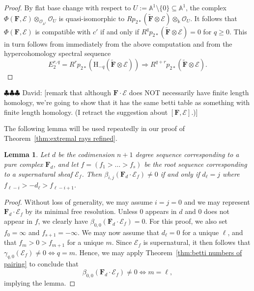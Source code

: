 \documentclass[12pt]{amsart}
\newtheorem{lemma}{Lemma}[section]
\theoremstyle{definition}
\theoremstyle{remark}
\newcommand{\kk}{\Bbbk}
\renewcommand{\AA}{\mathbb{A}}
\newcommand{\HH}{\mathrm{H}}
\newcommand{\cc}{c}
\newcommand{\dd}{d}
\newcommand{\cO}{\mathcal{O}}
\newcommand{\cE}{\mathcal{E}}
\newcommand{\FF}{\mathbf{F}}
\newcommand{\david}[1]{{\color{red} \sf $\clubsuit\clubsuit\clubsuit$ David: [#1]}}
\begin{document}
\begin{proof}
By flat base change with respect to $U:=\AA^1\setminus \{0\} \subseteq \AA^1$, the complex $\Phi(\FF,\cE)\otimes_{\cO_{\AA^1}} \cO_{U}$ is quasi-isomorphic to $Rp_{2*}\left(\widetilde{\FF}\otimes \cE\right)\otimes_{\kk} \cO_{U}$.  It follows that $\Phi(\FF,\cE)$ is compatible with $\cc'$ if and only if $R^qp_{2*}\left(\widetilde{\FF}\otimes \cE\right)=0$ for $q\geq 0$.  This in turn follows from immediately from the above computation and from the hypercohomology spectral sequence
\[
E_2^{r,q}=R^{r}p_{2*}(\HH_{-q}(\widetilde{\FF}\otimes \cE))\Rightarrow R^{q+r}p_{2*}(\widetilde{\FF}\otimes \cE).
\]
\end{proof}

\david{remark that although $\FF\cdot \cE$ does NOT necessarily have finite length homology,
we're going to show that it has the same betti table as something with finite length homology.
(I retract the suggestion about $[\FF, \cE]$.)}
 
The following lemma will be used repeatedly in our proof of Theorem~\ref{thm:extremal rays refined}.
\begin{lemma}\label{lem:pure and supernatural}
Let $\dd$ be the codimension $n+1$ degree sequence corresponding to a pure complex $\FF_d$, and let $f=(f_1>\dots >f_s)$ be the root sequence corresponding to a supernatural sheaf $\cE_f$.  Then
$
\beta_{i,j}(\FF_d\cdot \cE_f)\ne 0
$
if and only if $d_\ell=j$ where $f_{\ell-i}>-d_{\ell}>f_{\ell-i+1}$.\end{lemma}
\begin{proof}
Without loss of generality, we may assume $i=j=0$ and we may represent $\FF_d\cdot \cE_f$ by its minimal free resolution. Unless $0$ appears in $\dd$ and $0$ does not appear in $f$, we clearly have $\beta_{0,0}(\FF_d\cdot \cE_f)=0$.  For this proof, we also set $f_0=\infty$ and $f_{s+1}=-\infty$. We may now assume that $d_{\ell}=0$ for a unique $\ell$, and that $f_m>0>f_{m+1}$ for a unique $m$.
Since $\cE_f$ is supernatural, it then follows that $\gamma_{q,0}(\cE_f)\ne 0 \iff q=m$.  Hence, we may apply Theorem~\ref{thm:betti numbers of pairing} to conclude that
\[
\beta_{0,0}(\FF_d\cdot \cE_f)\ne 0 \iff m=\ell,
\]
implying the lemma.
\end{proof}
\end{document}
